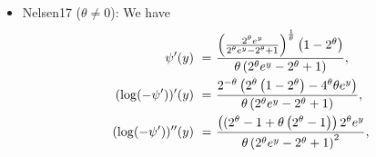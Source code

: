 \documentclass{article}
\def\of#1{\left(#1\right)} %
\def\inbrackets#1{\of{#1}} %
\newcommand{\TP}{\mathrm{TP_2}}
\begin{document}
\begin{itemize}
\begin{align}
        (\log(\psi''))''(y) ~=~ & \frac{3 \left(\left(\theta + y - 1\right)^{2} - 4 \theta\right)}{\left(4 \theta + \left(\theta + y - 1\right)^{2}\right)^{2}} \label{frm:nelsen16_log3}
    .\end{align}
    \eqref{frm:nelsen16_log3} has roots for $y = 1- \theta \pm 2\sqrt{\theta}$, and the larger root will only be non-positive for $\theta \geq 3 + 2\sqrt{2}$, so that $\TP$ only holds under this condition.
    Regarding CI, let $f_\theta(y)$ denote the denominator of \eqref{frm:n16_ci_2}.
    Then, it is 
    \begin{align*}
        f'_\theta(y)
        = & \inbrackets{\sqrt{4 \theta + \left(\theta + y - 1\right)^{2}} - 2 \left(\theta + y - 1\right)} \left(\sqrt{4 \theta + \left(\theta + y - 1\right)^{2}} - (\theta + y - 1)\right)
    .\end{align*}
    Both factors of $f'_\theta(y)$ are non-increasing in $y$.
    Furthermore, it is $f'_0(0)>0$, $f'_\theta(0)=0$ if and only if $\theta=3$, and, e.g., $f'_5(0) < 0$.
    Consequently, \eqref{frm:n16_ci_2} is non-decreasing in $y$ if and only if $\theta\geq 3$, and thus CI holds in this range.
    \item Nelsen17 ($\theta \neq 0$): We have
    \begin{align}
        \psi'(y) ~=~ & \frac{\left(\frac{2^{\theta} e^{y}}{2^{\theta} e^{y} - 2^{\theta} + 1}\right)^{\frac{1}{\theta}} \left(1 - 2^{\theta}\right)}{\theta \left(2^{\theta} e^{y} - 2^{\theta} + 1\right)}, \nonumber\allowdisplaybreaks\\
        (\log(-\psi'))'(y) ~=~ & \frac{2^{- \theta} \left(2^{\theta} \left(1 - 2^{\theta}\right) - 4^{\theta} \theta e^{y}\right)}{\theta \left(2^{\theta} e^{y} - 2^{\theta} + 1\right)}, \nonumber\allowdisplaybreaks\\
        (\log(-\psi'))''(y) ~=~ & \frac{\left(  (2^{\theta} - 1 +  \theta \left(2^{\theta} - 1\right)\right) 2^{\theta}e^{y}}{\theta \left(2^{\theta} e^{y} - 2^{\theta} + 1\right)^{2}}, \label{frm:nelsen17log3}\\

\end{align}
\end{itemize}
\end{document}

